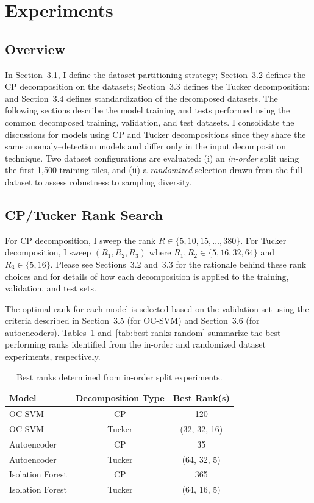 \documentclass[11pt]{article}
\begin{document}
\section{Experiments}
\label{sec:experiments}

\subsection{Overview}
In Section~3.1, I define the dataset partitioning strategy; Section~3.2 defines the CP decomposition on the datasets; Section~3.3 defines the Tucker decomposition; and Section~3.4 defines standardization of the decomposed datasets. The following sections describe the model training and tests performed using the common decomposed training, validation, and test datasets. I consolidate the discussions for models using CP and Tucker decompositions since they share the same anomaly–detection models and differ only in the input decomposition technique. Two dataset configurations are evaluated: (i) an \textit{in-order} split using the first 1,500 training tiles, and (ii) a \textit{randomized} selection drawn from the full dataset to assess robustness to sampling diversity.

\subsection{CP/Tucker Rank Search}
For CP decomposition, I sweep the rank \(R \in \{5,10,15,\dots,380\}\).
For Tucker decomposition, I sweep \((R_1,R_2,R_3)\) where
\(R_1,R_2 \in \{5,16,32,64\}\) and \(R_3 \in \{5,16\}\).
Please see Sections~3.2 and~3.3 for the rationale behind these rank choices and for details of how each decomposition is applied to the training, validation, and test sets.

The optimal rank for each model is selected based on the validation set using the criteria described in Section~3.5 (for OC-SVM) and Section~3.6 (for autoencoders).  
Tables~\ref{tab:best-ranks-inorder} and~\ref{tab:best-ranks-random} summarize the best-performing ranks identified from the in-order and randomized dataset experiments, respectively.

\begin{table}[H]
\centering
\caption{Best ranks determined from in-order split experiments.}
\label{tab:best-ranks-inorder}
\begin{tabular}{lcc}
\hline
\textbf{Model} & \textbf{Decomposition Type} & \textbf{Best Rank(s)} \\
\hline
OC-SVM         & CP     & 120 \\
OC-SVM         & Tucker & (32, 32, 16) \\
Autoencoder     & CP     & 35 \\
Autoencoder     & Tucker & (64, 32, 5) \\
Isolation Forest & CP     & 365 \\
Isolation Forest & Tucker & (64, 16, 5) \\
\hline
\end{tabular}
\end{table}
\end{document}
